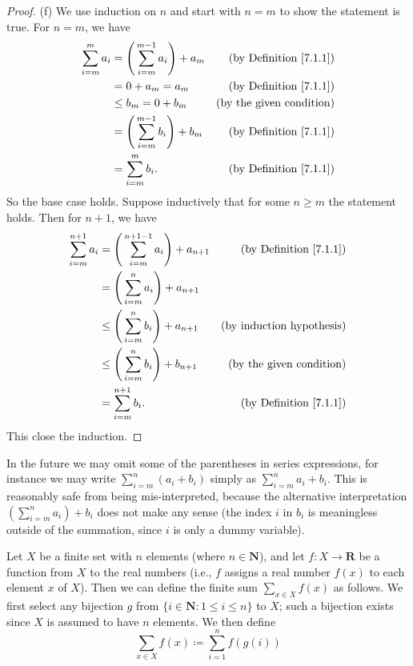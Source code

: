 \begin{proof}{(f)}
We use induction on \(n\) and start with \(n = m\) to show the statement is true.
For \(n = m\), we have
\begin{align*}
\sum_{i = m}^m a_i &= \Bigg(\sum_{i = m}^{m - 1} a_i\Bigg) + a_m & \text{(by Definition \ref{7.1.1})} \\
&= 0 + a_m = a_m & \text{(by Definition \ref{7.1.1})} \\
&\leq b_m = 0 + b_m & \text{(by the given condition)} \\
&= \Bigg(\sum_{i = m}^{m - 1} b_i\Bigg) + b_m & \text{(by Definition \ref{7.1.1})} \\
&= \sum_{i = m}^m b_i. & \text{(by Definition \ref{7.1.1})} \\
\end{align*}
So the base case holds.
Suppose inductively that for some \(n \geq m\) the statement holds.
Then for \(n + 1\), we have
\begin{align*}
\sum_{i = m}^{n + 1} a_i &= \Bigg(\sum_{i = m}^{n + 1 - 1} a_i\Bigg) + a_{n + 1} & \text{(by Definition \ref{7.1.1})} \\
&= \Bigg(\sum_{i = m}^n a_i\Bigg) + a_{n + 1} \\
&\leq \Bigg(\sum_{i = m}^n b_i\Bigg) + a_{n + 1} & \text{(by induction hypothesis)} \\
&\leq \Bigg(\sum_{i = m}^n b_i\Bigg) + b_{n + 1} & \text{(by the given condition)} \\
&= \sum_{i = m}^{n + 1} b_i. & \text{(by Definition \ref{7.1.1})} \\
\end{align*}
This close the induction.
\end{proof}

\begin{remark}\label{7.1.5}
In the future we may omit some of the parentheses in series expressions, for instance we may write \(\sum_{i = m}^n (a_i + b_i)\) simply as \(\sum_{i = m}^n a_i + b_i\).
This is reasonably safe from being mis-interpreted, because the alternative interpretation \((\sum_{i = m}^n a_i) + b_i\) does not make any sense
(the index \(i\) in \(b_i\) is meaningless outside of the summation, since \(i\) is only a dummy variable).
\end{remark}

\begin{definition}\label{7.1.6}
Let \(X\) be a finite set with \(n\) elements (where \(n \in \mathbf{N}\)), and let \(f : X \to \mathbf{R}\) be a function from \(X\) to the real numbers
(i.e., \(f\) assigns a real number \(f(x)\) to each element \(x\) of \(X\)).
Then we can define the finite sum \(\sum_{x \in X} f(x)\) as follows.
We first select any bijection \(g\) from \(\{i \in \mathbf{N} : 1 \leq i \leq n\}\) to \(X\);
such a bijection exists since \(X\) is assumed to have \(n\) elements.
We then define
\[
    \sum_{x \in X} f(x) \coloneqq \sum_{i = 1}^n f(g(i))
\]
\end{definition}

